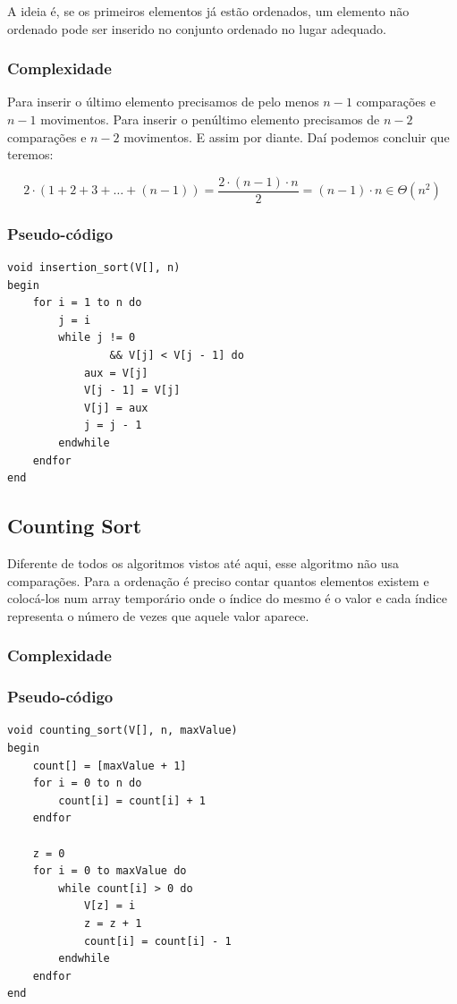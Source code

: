 A ideia é, se os primeiros elementos já estão ordenados, um elemento não
ordenado pode ser inserido no conjunto ordenado no lugar adequado.

\subsubsection{Complexidade}

Para inserir o último elemento precisamos de pelo menos $n - 1$
comparações e $n - 1$ movimentos. Para inserir o penúltimo elemento
precisamos de $n - 2$ comparações e $n - 2$ movimentos. E assim por
diante. Daí podemos concluir que teremos:

\begin{equation}
2 \cdot (1 + 2 + 3 + \dots + (n - 1)) = \frac{2 \cdot (n - 1) \cdot n}{2} = (n - 1) \cdot n \in \Theta(n^2)
\end{equation}

\subsubsection{Pseudo-código}

\begin{verbatim}
void insertion_sort(V[], n)
begin
    for i = 1 to n do
        j = i
        while j != 0
                && V[j] < V[j - 1] do
            aux = V[j]
            V[j - 1] = V[j]
            V[j] = aux
            j = j - 1
        endwhile
    endfor
end
\end{verbatim}
\subsection{Counting Sort}

Diferente de todos os algoritmos vistos até aqui, esse algoritmo não usa
comparações. Para a ordenação é preciso contar quantos elementos existem
e colocá-los num array temporário onde o índice do mesmo é o valor e
cada índice representa o número de vezes que aquele valor aparece.

\subsubsection{Complexidade}

\subsubsection{Pseudo-código}

\begin{verbatim}
void counting_sort(V[], n, maxValue)
begin
    count[] = [maxValue + 1]
    for i = 0 to n do
        count[i] = count[i] + 1
    endfor

    z = 0
    for i = 0 to maxValue do
        while count[i] > 0 do
            V[z] = i
            z = z + 1
            count[i] = count[i] - 1
        endwhile
    endfor
end
\end{verbatim}
